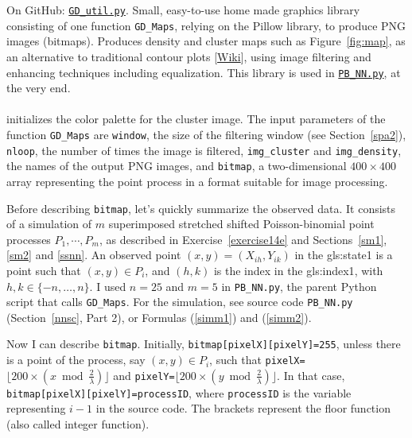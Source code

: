 \documentclass[10pt]{article}
\begin{document}
{On GitHub}: \href{https://github.com/VincentGranville/Point-Processes/blob/main/Source\%20Code/GD_util.py}{\texttt{GD\_util.py}}. Small, easy-to-use home made graphics library
consisting of one function \texttt{GD\_Maps}, relying on the Pillow library, to produce PNG images (bitmaps). Produces
density and cluster maps such as Figure~\ref{fig:map}, as an alternative to traditional contour plots [\href{https://scipython.com/book/chapter-7-matplotlib/examples/a-simple-contour-plot/}{Wiki}], using image filtering and enhancing techniques including
equalization. This library is used in
 \href{https://github.com/VincentGranville/Point-Processes/blob/main/Source\%20Code/PB_NN.py}{\texttt{PB\_NN.py}}, at the very end. \\
\quad \\
 initializes the color palette for the cluster image. The input parameters of the function \texttt{GD\_Maps} are
 \texttt{window}, the size of the filtering window (see Section~\ref{spa2}), \texttt{nloop}, the number of times the image is filtered,
\texttt{img\_cluster} and \texttt{img\_density}, the names of the output PNG images, and \texttt{bitmap}, a two-dimensional $400\times 400$
array representing the point process in a format suitable for image processing.  

Before describing \texttt{bitmap}, 
let's quickly summarize the observed data. It consists of a simulation of $m$ superimposed stretched shifted Poisson-binomial point processes  $P_1,\cdots,P_m$, as described in Exercise~\ref{exercise14e} and Sections~\ref{sm1}, \ref{sm2} and \ref{ssnn}. An observed point $(x,y)=(X_{ih}, Y_{ik})$
in the \gls{gls:state1}   is a point such that
$(x,y)\in P_i$, and $(h, k)$ is the \textcolor{index}{index}
in the \gls{gls:index1}, with $h,k\in\{-n,\dots,n\}$. I used $n=25$ and $m=5$ in \texttt{PB\_NN.py}, the parent Python script that calls \texttt{GD\_Maps}.  For the simulation, see source code \texttt{PB\_NN.py} (Section~\ref{nnsc}, Part 2), or Formulas (\ref{simm1}) and (\ref{simm2}).

Now I can describe \texttt{bitmap}.  Initially, \texttt{bitmap[pixelX][pixelY]=255}, unless there is a point of the process,
 say $(x,y)\in P_i$,  such that  \texttt{pixelX=}$\lfloor 200 \times (x \bmod \frac{2}{\lambda}) \rfloor$  and 
\texttt{pixelY=}$\lfloor 200 \times (y \bmod \frac{2}{\lambda}) \rfloor$.
In that case, \texttt{bitmap[pixelX][pixelY]=processID}, where \texttt{processID} is the variable representing $i-1$  in the
source code. The brackets represent the floor function (also called integer function).
\end{document}
